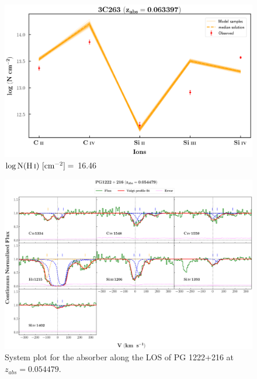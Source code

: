   
  \begin{figure}[!h]
      \centering
      \includegraphics[width=0.9\linewidth]{Ionisation-Modelling-Plots/3c263-z=0.063397-compIV_logZ=-1.png}
      \caption{$\log \text{N}(\ion{H}{i}) \ [\text{cm}^{-2}]=$ 16.46}
  \end{figure}
  
  \restoregeometry
  
  \newpage
  \thispagestyle{empty}

  \begin{landscape}
  
  \begin{figure}
      \centering
      \vspace{-10mm}
      \hspace*{-20mm}
      \includegraphics[width=1.1\linewidth]{System-Plots/PG1222+216_z=0.054479_sys_plot.png}
      \caption{System plot for the absorber along the LOS of PG 1222+216 at $z_{abs} = 0.054479$. }
  \end{figure}
  
  \end{landscape}
  
